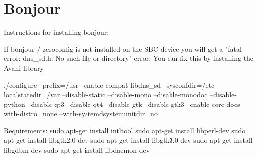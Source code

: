 \section{Bonjour}

Instructions for installing bonjour:

If bonjour / zeroconfig is not installed on the SBC device you will get a "fatal error: dns\_sd.h: No such file or directory" error. You can fix this by installing the Avahi library


./configure --prefix=/usr  --enable-compat-libdns\_sd  --sysconfdir=/etc  --localstatedir=/var  --disable-static  --disable-mono  --disable-monodoc  --disable-python  --disable-qt3  --disable-qt4   --disable-gtk  --disable-gtk3  --enable-core-docs  --with-distro=none --with-systemdsystemunitdir=no





Requirements:
sudo apt-get install intltool
sudo apt-get install libperl-dev
sudo apt-get install libgtk2.0-dev
sudo apt-get install libgtk3.0-dev
sudo apt-get install libgdbm-dev
sudo apt-get install libdaemon-dev
